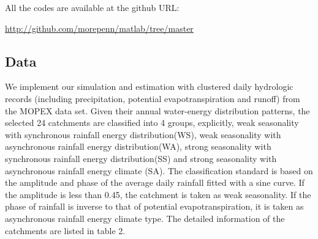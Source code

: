 \documentclass[11pt]{article}
\begin{document}
 
All the codes are available at the github URL: 

{\href{http://github.com/morepenn/matlab/tree/master}{\underline{http://github.com/morepenn/matlab/tree/master}}}









 
 
 

\newpage
\begin{center}
\section{Data}
\end{center}

We implement our simulation and estimation with clustered daily hydrologic records (including precipitation, potential evapotranspiration and runoff) from the MOPEX data set\cite{duan2006model}. Given their annual water-energy distribution patterns, the selected 24 catchments are classified into 4 groups, explicitly, weak seasonality with synchronous rainfall energy distribution(WS), weak seasonality with asynchronous rainfall energy distribution(WA), strong seasonality with  synchronous rainfall energy distribution(SS) and strong seasonality with asynchronous rainfall energy climate (SA). The classification standard is based on the amplitude and phase of the average daily rainfall fitted with a sine curve. If the amplitude is less than 0.45, the catchment is taken as weak seasonality. If the phase of rainfall is inverse to that of potential evapotranspiration, it is taken as asynchronous rainfall energy climate type. The detailed information of the catchments are listed in table 2. 
\end{document}

